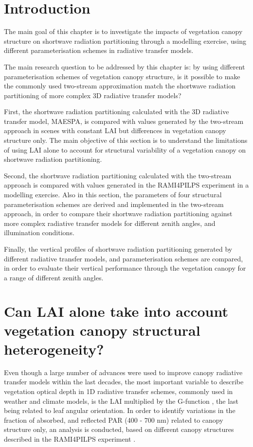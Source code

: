 \section{Introduction}\label{introduction}
The main goal of this chapter is to investigate the impacts of vegetation canopy structure on shortwave radiation partitioning through a modelling exercise, using different parameterisation schemes in radiative transfer models.

The main research question to be addressed by this chapter is: by using different parameterisation schemes of vegetation canopy structure, is it possible to make the commonly used two-stream approximation \citep{Sellers1985} match the shortwave radiation partitioning of more complex 3D radiative transfer models?

First, the shortwave radiation partitioning calculated with the 3D radiative transfer model, MAESPA, is compared with values generated by the two-stream approach in scenes with constant LAI but differences in vegetation canopy structure only. The main objective of this section is to understand the limitations of using LAI alone to account for structural variability of a vegetation canopy on shortwave radiation partitioning.

Second, the shortwave radiation partitioning calculated with the two-stream approach is compared with values generated in the RAMI4PILPS experiment \citep{Widlowski2011} in a modelling exercise. Also in this section, the parameters of four structural parameterisation schemes \citep{Nilson1971,Kucharik1999,pinty2006,Ni-Meister2010} are derived and implemented in the two-stream approach, in order to compare their shortwave radiation partitioning against more complex radiative transfer models for different zenith angles, and illumination conditions.

Finally, the vertical profiles of shortwave radiation partitioning generated by different radiative transfer models, and parameterisation schemes are compared, in order to evaluate their vertical performance through the vegetation canopy for a range of different zenith angles.

\section{Can LAI alone take into account vegetation canopy structural heterogeneity?}\label{section:lai}
Even though a large number of advances were used to improve canopy radiative transfer models within the last decades, the most important variable to describe vegetation optical depth in 1D radiative transfer schemes, commonly used in weather and climate models, is the LAI \citep{Yang2001} multiplied by the G-function \citep{Ross1981}, the last being related to leaf angular orientation. In order to identify variations in the fraction of absorbed, and reflected PAR (400 - 700 nm) related to canopy structure only, an analysis is conducted, based on different canopy structures described in the RAMI4PILPS experiment \citep{Widlowski2011}.

